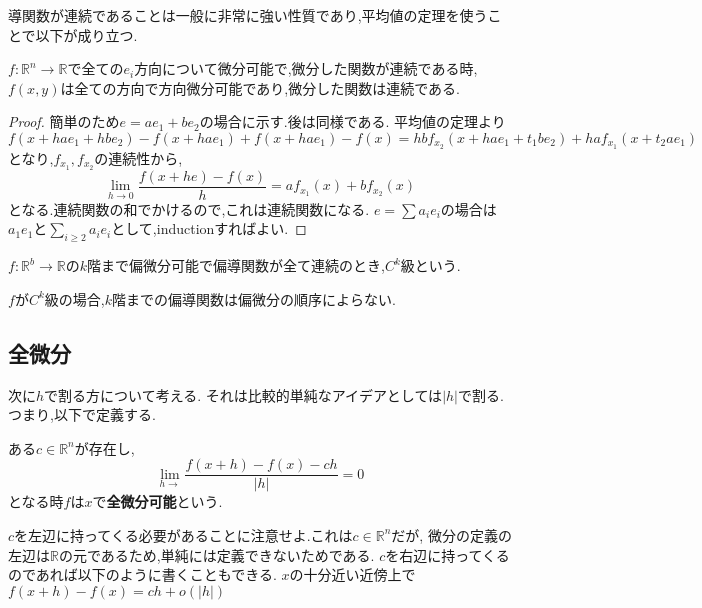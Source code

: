 導関数が連続であることは一般に非常に強い性質であり,平均値の定理を使うことで以下が成り立つ.


\begin{prop}
$f:\mathbb{R}^n \to \mathbb{R}$で全ての$e_i$方向について微分可能で,微分した関数が連続である時,$f(x,y)$は全ての方向で方向微分可能であり,微分した関数は連続である.
\end{prop}
\begin{proof}
簡単のため$e = ae_1 + be_2$の場合に示す.後は同様である.
平均値の定理より
\begin{equation*}
f(x+ hae_1 + hbe_2) - f(x + hae_1) + f(x+hae_1) - f(x) = hbf_{x_2}(x + hae_1 + t_1be_2) + haf_{x_1}(x+t_2ae_1)
\end{equation*}
となり,$f_{x_1}, f_{x_2}$の連続性から,
\begin{equation*}
\lim_{h \to 0} \frac{f(x+he) - f(x)}{h} = af_{x_1}(x) + bf_{x_2}(x)
\end{equation*}
となる.連続関数の和でかけるので,これは連続関数になる.
$e = \sum a_i e_i$の場合は$a_1e_1$と$\sum_{i \ge 2} a_i e_i$として,inductionすればよい.
\end{proof}

\begin{dfn}
$f:\mathbb{R}^b \to \mathbb{R}$の$k$階まで偏微分可能で偏導関数が全て連続のとき,$C^k$級という.
\end{dfn}

\begin{prop}
$f$が$C^k$級の場合,$k$階までの偏導関数は偏微分の順序によらない.
\end{prop}

\subsection{全微分}
次に$h$で割る方について考える.
それは比較的単純なアイデアとしては$|h|$で割る.
つまり,以下で定義する.
\begin{screen}
\begin{dfn}
ある$c \in \mathbb{R}^n$が存在し,
\begin{equation*}
 \lim_{h \to }\frac{f(x+h) - f(x) - ch}{|h|}  = 0
\end{equation*}
となる時$f$は$x$で\textbf{全微分可能}という.
\end{dfn}
\end{screen}
$c$を左辺に持ってくる必要があることに注意せよ.これは$c \in \mathbb{R}^n$だが,
微分の定義の左辺は$\mathbb{R}$の元であるため,単純には定義できないためである.
$c$を右辺に持ってくるのであれば以下のように書くこともできる.
$x$の十分近い近傍上で$f(x+h)-f(x) = ch + o(|h|)$

